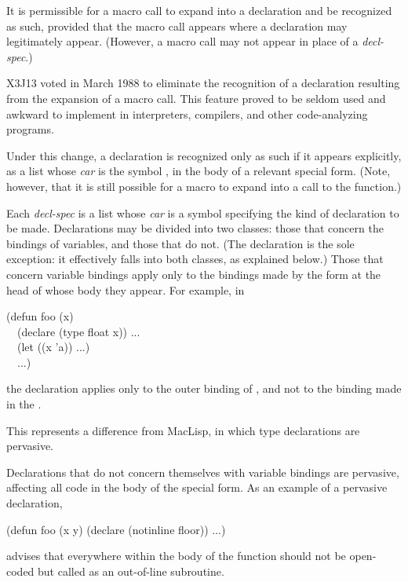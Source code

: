 \begin{defspec}
It is permissible for a macro call to expand into a declaration
and be recognized as such, provided that the macro call
appears where a declaration may legitimately appear.
(However, a macro call may not appear in place of a {\it decl-spec}.)

\begin{new}
X3J13 voted in March 1988
to eliminate the recognition of
a declaration resulting from the expansion of a macro call.
This feature proved to be seldom used and
awkward to implement in interpreters, compilers, and other code-analyzing programs.

Under this change, a declaration is recognized only as such if
it appears explicitly, as a list whose {\it car} is the symbol ,
in the body of a relevant special form.  (Note, however, that it
is still possible for a macro to expand into a call to the 
function.)
\end{new}

Each {\it decl-spec} is a list whose {\it car} is a symbol
specifying the kind of declaration to be made.  Declarations may be
divided into two classes: those that concern the bindings of variables,
and those that do not.  (The  declaration is the sole
exception: it effectively falls into both classes, as explained below.)
Those that concern variable bindings apply
only to the bindings made by the form at the head of whose body they
appear.  For example, in
\begin{lisp}
(defun foo (x) \\
~~(declare (type float x)) ... \\
~~(let ((x 'a)) ...) \\
~~...)
\end{lisp}
the  declaration applies only to the outer binding of ,
and not to the binding made in the .

\beforenoterule
\begin{incompatibility}
This represents a difference from MacLisp, in which type
declarations are pervasive.
\end{incompatibility}
\afternoterule

Declarations that do not concern themselves with variable bindings are
pervasive, affecting all code in the body of the special form.
As an example of a pervasive declaration,
\begin{lisp}
(defun foo (x y) (declare (notinline floor)) ...)
\end{lisp}
advises that everywhere within the body of  the function
 should not be open-coded but called as an out-of-line subroutine.


\end{defspec}
